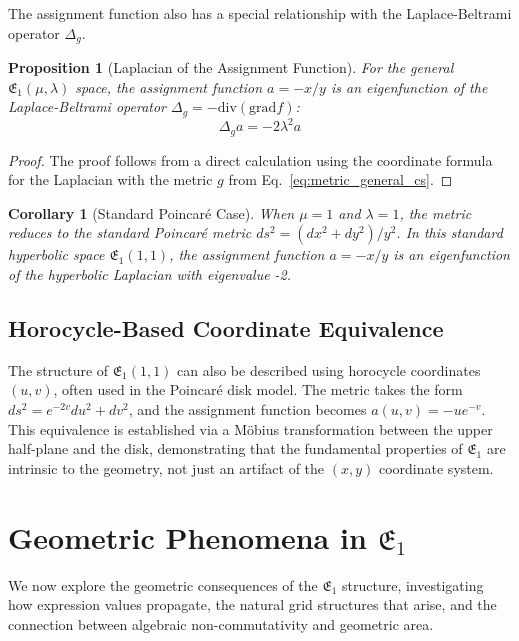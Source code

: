 \documentclass[12pt]{article}
\newtheorem{proposition}{Proposition}[section]
\newtheorem{corollary}{Corollary}[section]
\begin{document}
The assignment function also has a special relationship with the Laplace-Beltrami operator \( \Delta_g \).

\begin{proposition}[Laplacian of the Assignment Function]\label{prop:laplacian_general_cs}
For the general \( \mathfrak{E}_1(\mu, \lambda) \) space, the assignment function \( a = -x/y \) is an eigenfunction of the Laplace-Beltrami operator \( \Delta_g = -\mathrm{div}(\mathrm{grad} f) \):
\[
\Delta_g a = -2\lambda^2 a
\]
\end{proposition}
\begin{proof}
The proof follows from a direct calculation using the coordinate formula for the Laplacian with the metric \( g \) from Eq.~\eqref{eq:metric_general_cs}.
\end{proof}

\begin{corollary}[Standard Poincaré Case]\label{cor:laplacian_standard_cs}
When \( \mu = 1 \) and \( \lambda = 1 \), the metric reduces to the standard Poincaré metric \( ds^2 = (dx^2 + dy^2)/y^2 \). In this standard hyperbolic space \( \mathfrak{E}_1(1, 1) \), the assignment function \( a = -x/y \) is an eigenfunction of the hyperbolic Laplacian with eigenvalue -2.
\end{corollary}

\subsection{Horocycle-Based Coordinate Equivalence}

The structure of \( \mathfrak{E}_1(1, 1) \) can also be described using horocycle coordinates \( (u, v) \), often used in the Poincaré disk model. The metric takes the form \( ds^2 = e^{-2v} du^2 + dv^2 \), and the assignment function becomes \( a(u, v) = -u e^{-v} \). This equivalence is established via a Möbius transformation between the upper half-plane and the disk, demonstrating that the fundamental properties of \( \mathfrak{E}_1 \) are intrinsic to the geometry, not just an artifact of the \( (x, y) \) coordinate system.

\section{Geometric Phenomena in \( \mathfrak{E}_1 \)}\label{sec:propagation_grids_cs}

We now explore the geometric consequences of the \( \mathfrak{E}_1 \) structure, investigating how expression values propagate, the natural grid structures that arise, and the connection between algebraic non-commutativity and geometric area.
\end{document}
